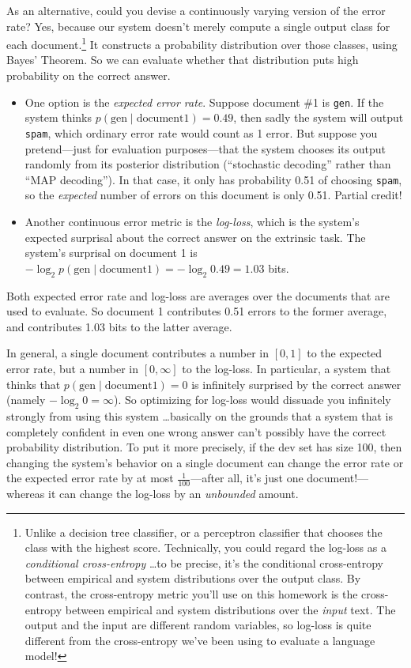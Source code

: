 As an alternative, could you devise a continuously varying version of the error rate? Yes, because our system doesn’t merely compute a single output class for each document.\footnote{Unlike a decision tree classifier, or a perceptron classifier that chooses the class with the highest score. Technically, you could regard the log-loss as a \textit{conditional cross-entropy} \ldots to be precise, it’s the conditional cross-entropy between empirical and system distributions over the output class. By contrast, the cross-entropy metric you’ll use on this homework is the cross-entropy between empirical and system distributions over the \textit{input} text. The output and the input are different random variables, so log-loss is quite different from the cross-entropy we’ve been using to evaluate a language model!} It constructs a probability distribution over those classes, using Bayes’ Theorem. So we can evaluate whether that distribution puts high probability on the correct answer.

\begin{itemize}
    \item One option is the \textit{expected error rate}. Suppose document \#1 is \texttt{gen}. If the system thinks $p(\text{gen} \mid \text{document1}) = 0.49$, then sadly the system will output \texttt{spam}, which ordinary error rate would count as 1 error. But suppose you pretend—just for evaluation purposes—that the system chooses its output randomly from its posterior distribution (“stochastic decoding” rather than “MAP decoding”). In that case, it only has probability 0.51 of choosing \texttt{spam}, so the \textit{expected} number of errors on this document is only 0.51. Partial credit!
    
    \item Another continuous error metric is the \textit{log-loss}, which is the system’s expected surprisal about the correct answer on the extrinsic task. The system’s surprisal on document 1 is $- \log_{2} p(\text{gen} \mid \text{document1}) = -\log_{2} 0.49 = 1.03$ bits.
\end{itemize}

Both expected error rate and log-loss are averages over the documents that are used to evaluate. So document 1 contributes 0.51 errors to the former average, and contributes 1.03 bits to the latter average.

In general, a single document contributes a number in $[0,1]$ to the expected error rate, but a number in $[0,\infty]$ to the log-loss. In particular, a system that thinks that $p(\text{gen} \mid \text{document1}) = 0$ is infinitely surprised by the correct answer (namely $-\log_{2}0 = \infty$). So optimizing for log-loss would dissuade you infinitely strongly from using this system \ldots basically on the grounds that a system that is completely confident in even one wrong answer can’t possibly have the correct probability distribution. To put it more precisely, if the dev set has size 100, then changing the system’s behavior on a single document can change the error rate or the expected error rate by at most $\tfrac{1}{100}$—after all, it’s just one document!—whereas it can change the log-loss by an \textit{unbounded} amount.


